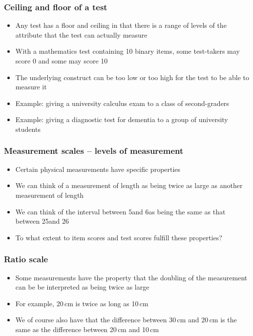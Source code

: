 \documentclass[compress]{beamer}\usepackage[]{graphicx}\usepackage[]{xcolor}
\begin{document}
\begin{frame}[fragile]
  \frametitle{Ceiling and floor of a test}
    \begin{itemize}
      \item Any test has a floor and ceiling in that there is a range of levels of the attribute that the test can actually measure
      \item With a mathematics test containing 10 binary items, some test-takers may score 0 and some may score 10
      \item The underlying construct can be too low or too high for the test to be able to measure it
      \item Example: giving a university calculus exam to a class of second-graders
      \item Example: giving a diagnostic test for dementia to a group of university students
    \end{itemize}
\end{frame}


\begin{frame}[fragile]
  \frametitle{Measurement scales -- levels of measurement}
    \begin{itemize}
      \item Certain physical measurements have specific properties
      \item We can think of a measurement of length as being twice as large as another measurement of length
      \item We can think of the interval between 5\C and 6\C as being the same as that between 25\C and 26\C
      \item To what extent to item scores and test scores fulfill these properties?
    \end{itemize}
\end{frame}


\begin{frame}[fragile]
  \frametitle{Ratio scale}
    \begin{itemize}
      \item Some measurements have the property that the doubling of the measurement can be be interpreted as being twice as large
      \item For example, 20\,cm is twice as long as 10\,cm
      \item We of course also have that the difference between 30\,cm and 20\,cm is the same as the difference between 20\,cm and 10\,cm
    \end{itemize}
\end{frame}
\end{document}
